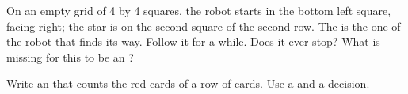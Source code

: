 \begin{exercise}[$\star\star$]\label{exo:g4:algorithms-repeat-and-decide:10}
On an empty grid of 4 by 4 squares, the robot starts in the bottom left square,
facing right; the star is on the second square of the second row. The
 is the one of the robot that finds its way. Follow it for a while.
Does it ever stop? What is missing for this to be an ?
\end{exercise}

\begin{exercise}[$\star\star$]\label{exo:g4:algorithms-repeat-and-decide:11}
Write an  that counts the red cards of a row of cards. Use a  and
a decision.
\end{exercise}
